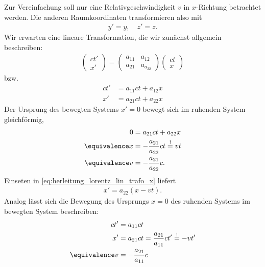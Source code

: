 Zur Vereinfachung soll nur eine Relativgeschwindigkeit $v$ in $x$-Richtung betrachtet werden.
Die anderen Raumkoordinaten transformieren also mit
\begin{align*}
    y'=y, \quad z'=z.
\end{align*}
Wir erwarten eine lineare Transformation, die wir zunächst allgemein beschreiben:
\begin{align}
    \label{eq:herleitung_lorentz_lin_trafo}
    \begin{pmatrix} ct' \\ x' \end{pmatrix} = \begin{pmatrix} a_{11} & a_{12} \\ a_{21} & a_{a_22} \end{pmatrix} \begin{pmatrix} ct \\ x \end{pmatrix}
\end{align}
bzw.
\begin{align}
    \label{eq:herleitung_lorentz_lin_trafo_ct}
    ct' & = a_{11} ct + a_{12}x \\
    \label{eq:herleitung_lorentz_lin_trafo_x}
    x'  & = a_{21} ct + a_{22}x
\end{align}
Der Ursprung des bewegten Systems $x'=0$ bewegt sich im ruhenden System gleichförmig,
\begin{align}
    0              & = a_{21} ct + a_{22}x \nonumber                       \\
    \equivalence x & = -\frac{a_{21}}{a_{22}}ct \overset{!}{=}vt \nonumber \\
    \label{eq:herleitung_lorentz_v1}
    \equivalence v & = -\frac{a_{21}}{a_{22}} c.
\end{align}
Einseten in \eqref{eq:herleitung_lorentz_lin_trafo_x} liefert
\begin{align}
    \label{eq:herleitung_lorentz_xprime}
    x'=a_{22} (x-vt).
\end{align}
Analog lässt sich die Bewegung des Ursprungs $x=0$ des ruhenden Systems im bewegten System beschreiben:
\begin{align}
    ct'            & = a_{11}ct \nonumber                                                \\
    x'             & = a_{21}ct = \frac{a_{21}}{a_{11}}ct' \overset{!}{=} -vt' \nonumber \\
    \label{eq:herleitung_lorentz_v2}
    \equivalence v & =-\frac{a_{21}}{a_{11}}c
\end{align}
